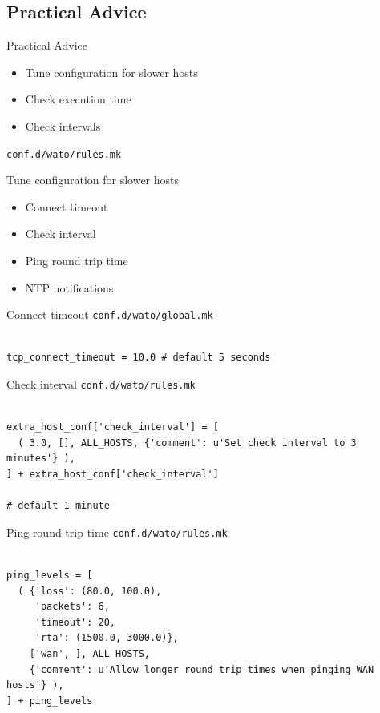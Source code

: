 \subsection{Practical Advice}
\begin{frame}{Practical Advice}
\begin{itemize}
\item Tune configuration for slower hosts
\item Check execution time
\item Check intervals
\end{itemize}
\end{frame}


\verb|conf.d/wato/rules.mk|

\begin{frame}{Tune configuration for slower hosts}
\begin{itemize}
\item Connect timeout
\item Check interval
\item Ping round trip time
\item NTP notifications
\end{itemize}
\end{frame}

\begin{frame}[fragile]{Connect timeout}
\verb|conf.d/wato/global.mk|
\begin{lstlisting}

tcp_connect_timeout = 10.0 # default 5 seconds

\end{lstlisting}
\end{frame}

\begin{frame}[fragile]{Check interval}
\verb|conf.d/wato/rules.mk|
\begin{lstlisting}

extra_host_conf['check_interval'] = [
  ( 3.0, [], ALL_HOSTS, {'comment': u'Set check interval to 3 minutes'} ),
] + extra_host_conf['check_interval']

# default 1 minute
\end{lstlisting}
\end{frame}

\begin{frame}[fragile]{Ping round trip time}
\verb|conf.d/wato/rules.mk|
\begin{lstlisting}

ping_levels = [
  ( {'loss': (80.0, 100.0), 
     'packets': 6, 
     'timeout': 20, 
     'rta': (1500.0, 3000.0)}, 
    ['wan', ], ALL_HOSTS, 
    {'comment': u'Allow longer round trip times when pinging WAN hosts'} ),
] + ping_levels

\end{lstlisting}
\end{frame}

